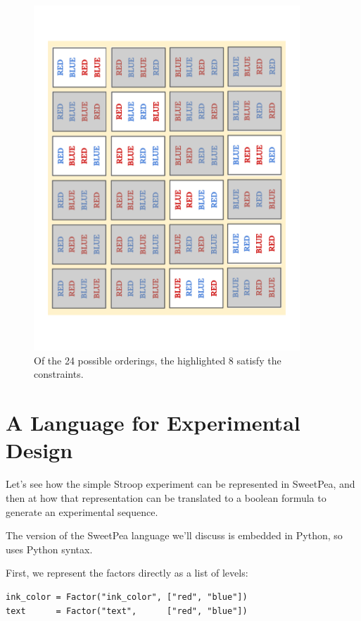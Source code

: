 \begin{figure}[t]
    \centerline{\includegraphics[angle=270,origin=c,width=10cm]{fig_valid_seqs}}
    \caption{Of the 24 possible orderings, the highlighted 8 satisfy the constraints.}%
    \label{fig:valid_seqs}%
\end{figure}


\section{A Language for Experimental Design}

Let's see how the simple Stroop experiment can be represented in SweetPea, and then at how that representation can be translated to a boolean formula to generate an experimental sequence.

The version of the SweetPea language we'll discuss is embedded in Python, so uses Python syntax.

First, we represent the factors directly as a list of levels:

\begin{verbatim}
ink_color = Factor("ink_color", ["red", "blue"])
text      = Factor("text",      ["red", "blue"])
\end{verbatim}

